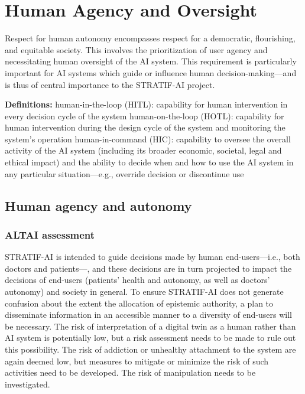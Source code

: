 \documentclass[
  letterpaper,
  DIV=11,
  numbers=noendperiod]{scrreport}
\begin{document}

\hypertarget{human-agency-and-oversight}{%
\chapter{Human Agency and Oversight}\label{human-agency-and-oversight}}

Respect for human autonomy encompasses respect for a democratic,
flourishing, and equitable society. This involves the prioritization of
user agency and necessitating human oversight of the AI system. This
requirement is particularly important for AI systems which guide or
influence human decision-making---and is thus of central importance to
the STRATIF-AI project.

\textbf{Definitions:} human-in-the-loop (HITL): capability for human
intervention in every decision cycle of the system human-on-the-loop
(HOTL): capability for human intervention during the design cycle of the
system and monitoring the system's operation human-in-command (HIC):
capability to oversee the overall activity of the AI system (including
its broader economic, societal, legal and ethical impact) and the
ability to decide when and how to use the AI system in any particular
situation---e.g., override decision or discontinue use

\hypertarget{human-agency-and-autonomy}{%
\section{Human agency and autonomy}\label{human-agency-and-autonomy}}

\hypertarget{altai-assessment}{%
\subsection*{ALTAI assessment}\label{altai-assessment}}

STRATIF-AI is intended to guide decisions made by human
end-users---i.e., both doctors and patients---, and these decisions are
in turn projected to impact the decisions of end-users (patients' health
and autonomy, as well as doctors' autonomy) and society in general. To
ensure STRATIF-AI does not generate confusion about the extent the
allocation of epistemic authority, a plan to disseminate information in
an accessible manner to a diversity of end-users will be necessary. The
risk of interpretation of a digital twin as a human rather than AI
system is potentially low, but a risk assessment needs to be made to
rule out this possibility. The risk of addiction or unhealthy attachment
to the system are again deemed low, but measures to mitigate or minimize
the risk of such activities need to be developed. The risk of
manipulation needs to be investigated.
\end{document}
